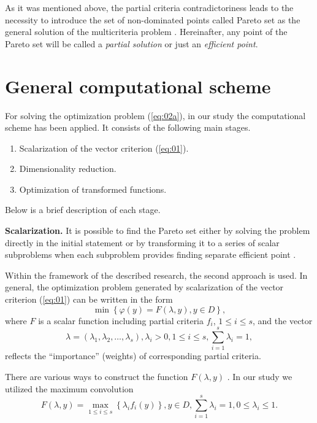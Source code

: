 \documentclass[runningheads]{llncs}
\begin{document}
As it was mentioned above, the partial criteria contradictoriness leads to the necessity to introduce the set of non-dominated points called Pareto set as the general solution of the multicriteria problem \cite{Miettinen1999,Ehrgott2005,Pardalos2017}. Hereinafter, any point of the Pareto set will be called a \textit{partial solution} or just an \textit{efficient point}.


\section{General computational scheme}
\label{sec:3}

For solving the optimization problem (\ref{eq:02a}), in our study the computational scheme \cite{ML_MCO_2023} has been applied. It consists of the following main stages.
 \begin{enumerate}
	\item Scalarization of the vector criterion (\ref{eq:01}).
	\item Dimensionality reduction.
	\item Optimization of transformed functions.
\end{enumerate}
Below is a brief description of each stage.

\textbf{Scalarization.} It is possible to find the Pareto set either by solving the problem directly in the initial statement \cite{Evtushenko2014,Deb2002,Durillo2010,Mostaghim2007,NDG09,RC05,ZLT01} or by transforming it to a series of scalar subproblems when each subproblem provides finding separate efficient point \cite{Pardalos2017,ML_MCO_2023,Gergel2019_2,Gergel2018,GergelKozinov2020}.

Within the framework of the described research, the second approach is used. In general, the optimization problem generated by scalarization of the vector criterion (\ref{eq:01}) can be written in the form  
\begin{equation}
\label{eq:04}
\min \left\{\varphi(y) = F( \lambda, y ), y \in D\right\},
\end{equation}
where $F$ is a scalar function including partial criteria $f_i$, $1 \leq i \leq s$, and the vector
\begin{equation}
\label{eq:04a}
\lambda = (\lambda_1, \lambda_2, \dots, \lambda_s), \lambda_i > 0, 1 \leq i \leq s, \sum_{i = 1}^s {\lambda_i} = 1,
\end{equation}
reflects the ``importance'' (weights) of corresponding partial criteria. 

There are various ways to construct the function $F(\lambda, y)$ \cite{Miettinen1999,Ehrgott2005,GergelKozinov2020,Marler2004}. In our study we utilized the maximum convolution 
\begin{equation}
\label{eq:05}
F(\lambda, y) = \max_{1 \leq i \leq s} \left\{\lambda_i f_i (y)\right\}, y \in D, \sum_{i=1}^s {\lambda_i} = 1, 0 \leq \lambda_i \leq 1.
\end{equation}
\end{document}
